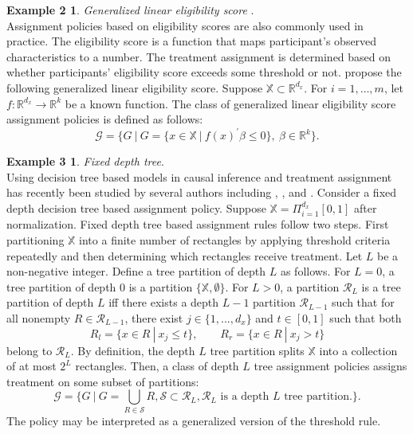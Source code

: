 \documentclass[12pt,oneside,reqno,english]{amsart}
\theoremstyle{definition}
\newtheorem*{ex2}{Example 2}
\newtheorem*{ex3}{Example 3}
\begin{document}
\begin{ex2}
\textit{Generalized linear eligibility score} \citep{KT:18}.\\
Assignment policies based on eligibility scores are also commonly used in practice. The eligibility score is a function that maps participant's observed characteristics to a number. The treatment assignment is determined based on whether participants' eligibility score exceeds some threshold or not. \cite{KT:18} propose the following generalized linear eligibility score. Suppose $\mathbb{X}\subset \mathbb{R}^{d_{x}}$. For $i=1,\ldots,m$, let $f:\mathbb{R}^{d_{x}}\rightarrow \mathbb{R}^{k}$ be a known function. 
The class of generalized linear eligibility score assignment policies is defined as follows:
\[\mathcal{G}=\{G\ |\ G=\{x\in \mathbb{X} \ | \ f(x)^{\prime}\beta \leq 0 \},\ \beta\in \mathbb{R}^{k}\}.\]
\end{ex2}
\begin{ex3}
\textit{Fixed depth tree}.\\
Using decision tree based models in causal inference and treatment assignment has recently been studied by several authors including 
\cite{AI:16}, \cite{Kallus:16}, and \cite{WA:18}. 
Consider a fixed depth decision tree based assignment policy. 
Suppose $\mathbb{X}= \Pi_{i=1}^{d_{x}}[0,1]$ after normalization. 
Fixed depth tree based assignment rules follow two steps. First partitioning $\mathbb{X}$ into a finite number of rectangles by applying threshold criteria repeatedly and then determining which rectangles receive treatment.  
Let $L$ be a non-negative integer. Define a tree partition of depth $L$ as follows. 
For $L=0$,  a tree partition of depth $0$ is a partition $\{\mathbb{X},\emptyset\}$. 
For $L>0$, a partition $\mathcal{R}_{L}$ is a tree partition of depth $L$ iff there exists a depth $L-1$ partition $\mathcal{R}_{L-1}$ 
such that for all nonempty $R\in \mathcal{R}_{L-1}$, there exist $j\in\{1,...,d_{x}\}$ and
$t\in [0,1]$ such that both 
\[R_{l}=\{x\in R \ |\  x_{j}\leq t \},\qquad R_{r}=\{x\in R \ |\  x_{j}>t \}\]
belong to $\mathcal{R}_{L}$. 
By definition, the depth $L$ tree partition splits $\mathbb{X}$ into a collection of at most $2^{L}$ rectangles. 
Then, a class of depth $L$ tree assignment policies assigns treatment on some subset of partitions:  
\[\mathcal{G}=\{G\ |\ G=\bigcup_{R\in \mathcal{S}}R,   \mathcal{S} \subset \mathcal{R}_{L}, \mathcal{R}_{L}\mbox{ is a depth $L$ tree partition.} \}.\]
The policy may be interpreted as a generalized version of the threshold rule.  
\end{ex3}
\end{document}
